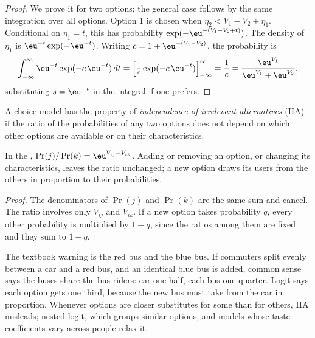 \begin{proof}
We prove it for two options; the general case follows by the same
integration over all options. Option 1 is chosen when $\eta_2 < V_1 - V_2 +
\eta_1$. Conditional on $\eta_1 = t$, this has probability $\exp(-\eu^{-(V_1 - V_2
+ t)})$. The density of $\eta_1$ is $\eu^{-t}\exp(-\eu^{-t})$. Writing $c = 1 +
\eu^{-(V_1 - V_2)}$, the probability is
\[
  \int_{-\infty}^{\infty} \eu^{-t} \exp(-c\,\eu^{-t})\, dt
  = \Bigl[\tfrac{1}{c}\exp(-c\,\eu^{-t})\Bigr]_{-\infty}^{\infty} = \frac1c
  = \frac{\eu^{V_1}}{\eu^{V_1} + \eu^{V_2}},
\]
substituting $s = \eu^{-t}$ in the integral if one prefers.
\end{proof}

\begin{definition}\label{def:b3:binary-outcomes:iia}
A choice model has the property of \emph{independence of irrelevant
alternatives} (IIA) if the ratio of the probabilities of any two options does not
depend on which other options are available or on their characteristics.
\end{definition}

\begin{proposition}\label{prop:b3:binary-outcomes:iia}
In the , $\Pr(j)/\Pr(k) = \eu^{V_{ij} - V_{ik}}$. Adding or
removing an option, or changing its characteristics, leaves the ratio unchanged;
a new option draws its users from the others in proportion to their
probabilities.
\end{proposition}

\begin{proof}
The denominators of $\Pr(j)$ and $\Pr(k)$ are the same sum and cancel. The
ratio involves only $V_{ij}$ and $V_{ik}$. If a new option takes probability
$q$, every other probability is multiplied by $1 - q$, since the ratios among
them are fixed and they sum to $1 - q$.
\end{proof}

The textbook warning is the red bus and the blue bus. If commuters split evenly
between a car and a red bus, and an identical blue bus is added, common sense
says the buses share the bus riders: car one half, each bus one quarter. Logit
says each option gets one third, because the new bus must take from the car in
proportion. Whenever options are closer substitutes for some than for others,
IIA misleads; nested logit, which groups similar options, and models whose
taste coefficients vary across people relax it.

